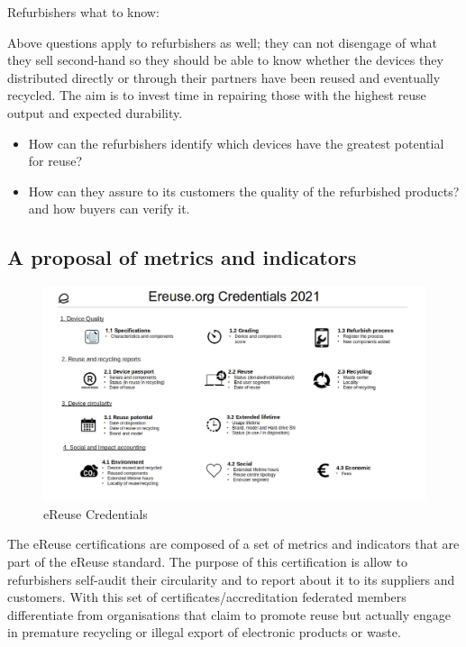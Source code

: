 \documentclass[
]{book}
\providecommand{\tightlist}{%
  \setlength{\itemsep}{0pt}\setlength{\parskip}{0pt}}
\begin{document}
Refurbishers what to know:

Above questions apply to refurbishers as well; they can not disengage of what they sell second-hand so they should be able to know whether the devices they distributed directly or through their partners have been reused and eventually recycled. The aim is to invest time in repairing those with the highest reuse output and expected durability.

\begin{itemize}
\tightlist
\item
  How can the refurbishers identify which devices have the greatest potential for reuse?
\item
  How can they assure to its customers the quality of the refurbished products? and how buyers can verify it.
\end{itemize}

\hypertarget{a-proposal-of-metrics-and-indicators}{%
\subsection{A proposal of metrics and indicators}\label{a-proposal-of-metrics-and-indicators}}

\begin{figure}

{\centering \includegraphics[width=1\linewidth]{./figs/4} 

}

\caption{eReuse Credentials}\label{fig:figreusecredentials}
\end{figure}

The eReuse certifications are composed of a set of metrics and indicators that are part of the eReuse standard. The purpose of this certification is allow to refurbishers self-audit their circularity and to report about it to its suppliers and customers. With this set of certificates/accreditation federated members differentiate from organisations that claim to promote reuse but actually engage in premature recycling or illegal export of electronic products or waste.
\end{document}
